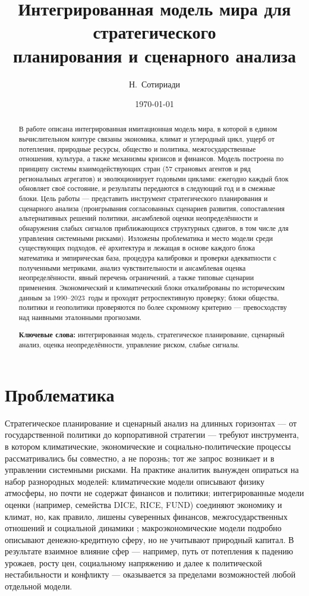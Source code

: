 \documentclass[11pt,a4paper]{article}
\title{\textbf{Интегрированная модель мира для стратегического\\планирования и сценарного анализа}}
\author{Н.~Сотириади}
\date{\today}
\begin{document}
\maketitle

\begin{abstract}
\noindent
В работе описана интегрированная имитационная модель мира, в которой в едином
вычислительном контуре связаны экономика, климат и углеродный цикл, ущерб от
потепления, природные ресурсы, общество и политика, межгосударственные отношения,
культура, а также механизмы кризисов и финансов. Модель построена по принципу
системы взаимодействующих стран (57 страновых агентов и ряд
региональных агрегатов) и эволюционирует годовыми циклами: ежегодно каждый блок обновляет
своё состояние, и результаты передаются в следующий год и в смежные блоки. Цель
работы --- представить инструмент
стратегического планирования и сценарного анализа (проигрывания согласованных сценариев
развития, сопоставления альтернативных решений политики, ансамблевой оценки
неопределённости и обнаружения слабых сигналов приближающихся структурных сдвигов, в том
числе для управления системными рисками). Изложены проблематика и место модели
среди существующих подходов, её архитектура и лежащая в основе каждого блока
математика и эмпирическая база, процедура калибровки и проверки адекватности с
полученными метриками, анализ чувствительности и ансамблевая оценка неопределённости, явный перечень ограничений, а также типовые сценарии применения. Экономический и климатический блоки откалиброваны по историческим данным
за 1990--2023~годы и проходят ретроспективную проверку; блоки общества, политики и
геополитики проверяются по более скромному критерию --- превосходству над наивными
эталонными прогнозами.

\medskip
\noindent\textbf{Ключевые слова:} интегрированная модель, стратегическое планирование,
сценарный анализ, оценка неопределённости, управление риском, слабые сигналы.
\end{abstract}

\section{Проблематика}

Стратегическое планирование и сценарный анализ на длинных горизонтах --- от государственной
политики до корпоративной стратегии --- требуют инструмента, в котором климатические,
экономические и социально-политические процессы рассматривались бы совместно, а не порознь;
тот же запрос возникает и в управлении системными рисками. На практике аналитик вынужден
опираться на набор разнородных моделей: климатические модели описывают физику атмосферы, но почти не
содержат финансов и политики; интегрированные модели оценки (например, семейства DICE,
RICE, FUND) соединяют экономику и климат, но, как правило, лишены суверенных финансов,
межгосударственных отношений и социальной динамики \citep{nordhaus2017}; макроэкономические
модели подробно описывают денежно-кредитную сферу, но не учитывают природный капитал.
В результате взаимное влияние сфер --- например, путь от потепления к падению урожаев,
росту цен, социальному напряжению и далее к политической нестабильности и конфликту ---
оказывается за пределами возможностей любой отдельной модели.
\end{document}
